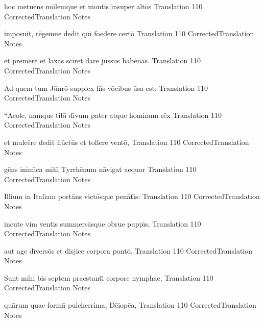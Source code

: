 \latline
  {hoc metu\={\macron e}ns m\={\macron o}lemque et mont\={\macron \i}s \={\macron \i}nsuper alt\={\macron o}s
}
  { Translation }
  {110}
  { CorrectedTranslation }
  { Notes }

\newpage
\latline
  {imposuit, r\={\macron e}gemue dedit qu\={\macron \i} foedere cert\={\macron o}
}
  { Translation }
  {110}
  { CorrectedTranslation }
  { Notes }


\latline
  {et premere et lax\={\macron a}s sc\={\macron \i}ret dare jussus hab\={\macron e}n\={\macron a}s.
}
  { Translation }
  {110}
  { CorrectedTranslation }
  { Notes }


\latline
  {Ad quem tum J\={\macron u}nr\={\macron o} supplex h\={\macron \i}s v\={\macron o}cibus \={\macron u}sa est:
}
  { Translation }
  {110}
  { CorrectedTranslation }
  { Notes }

\newpage
\latline
  {``Aeole, namque tib\={\macron \i} d\={\macron \i}vum pater atque hominum r\={\macron e}x
}
  { Translation }
  {110}
  { CorrectedTranslation }
  { Notes }


\latline
  {et mulc\={\macron e}re dedit fl\={\macron u}ct\={\macron u}s et tollere vent\={\macron o},
}
  { Translation }
  {110}
  { CorrectedTranslation }
  { Notes }


\latline
  {g\={\macron e}ns inim\={\macron \i}ca mih\={\macron \i} Tyrrh\={\macron e}num n\={\macron a}vigat aequor
}
  { Translation }
  {110}
  { CorrectedTranslation }
  { Notes }

\newpage

\latline
  {\={\macron I}llium in \={\macron I}taliam port\={\macron a}ns vict\={\macron o}sque pen\={\macron a}t\={\macron \i}s:
}
  { Translation }
  {110}
  { CorrectedTranslation }
  { Notes }


\latline
  {incute vim vent\={\macron \i}s summers\={\macron a}sque obrue pupp\={\macron \i}s,
}
  { Translation }
  {110}
  { CorrectedTranslation }
  { Notes }


\latline
  {aut age d\={\macron \i}vers\={\macron o}s et disjice corpora pont\={\macron o}.
}
  { Translation }
  {110}
  { CorrectedTranslation }
  { Notes }

\newpage

\latline
  {Sunt mihi bis septem praestant\={\macron \i} corpore nymphae,
}
  { Translation }
  {110}
  { CorrectedTranslation }
  { Notes }


\latline
  {qu\={\macron a}rum quae form\={\macron a} pulcherrima, D\={\macron e}iop\={\macron e}a,
}
  { Translation }
  {110}
  { CorrectedTranslation }
  { Notes }


